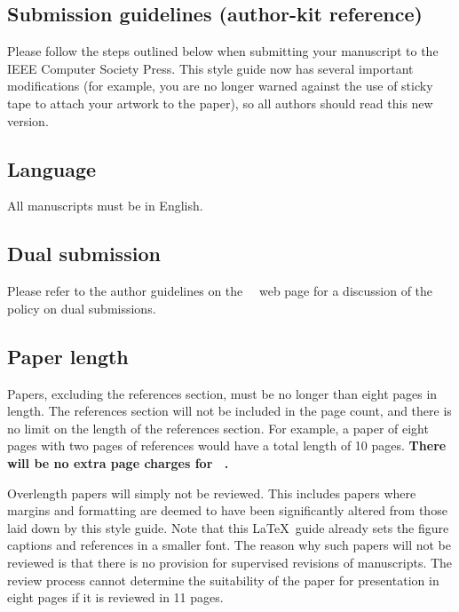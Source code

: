 
\subsection{Submission guidelines (author-kit reference)}

Please follow the steps outlined below when submitting your manuscript to the IEEE Computer Society Press.
This style guide now has several important modifications (for example, you are no longer warned against the use of sticky tape to attach your artwork to the paper), so all authors should read this new version.

\subsection{Language}

All manuscripts must be in English.

\subsection{Dual submission}

Please refer to the author guidelines on the \confName\ \confYear\ web page for a
discussion of the policy on dual submissions.

\subsection{Paper length}
Papers, excluding the references section, must be no longer than eight pages in length.
The references section will not be included in the page count, and there is no limit on the length of the references section.
For example, a paper of eight pages with two pages of references would have a total length of 10 pages.
{\bf There will be no extra page charges for \confName\ \confYear.}

Overlength papers will simply not be reviewed.
This includes papers where margins and formatting are deemed to have been significantly altered from those laid down by this style guide.
Note that this \LaTeX\ guide already sets the figure captions and references in a smaller font.
The reason why such papers will not be reviewed is that there is no provision for supervised revisions of manuscripts.
The review process cannot determine the suitability of the paper for presentation in eight pages if it is reviewed in 11 pages.

